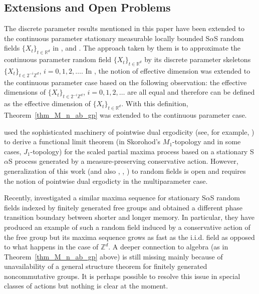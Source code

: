 \documentclass[12pt]{amsart}
\begin{document}
\subsection{Extensions and Open Problems} The discrete parameter results mentioned in this paper have been extended to the continuous parameter stationary measurable locally bounded S$\alpha$S random fields $\{X_t\}_{t \in \mathbb{R}^d}$ in \cite{rosinski:1995, rosinski:2000}, \cite{samorodnitsky:2004b} and \cite{roy:2010b}. The approach taken by them is to approximate the continuous parameter random field $\{X_t\}_{t \in \mathbb{R}^d}$ by its discrete parameter skeletons $\{X_t\}_{t \in  2^{-i}\mathbb{Z}^d}$, $i=0,1,2, \ldots$. In \cite{chakrabarty:roy:2013}, the notion of effective dimension was extended to the continuous parameter case based on the following observation: the effective dimensions of $\{X_t\}_{t \in  2^{-i}\mathbb{Z}^d}$, $i=0,1,2, \ldots$ are all equal and therefore can be defined as the effective dimension of $\{X_t\}_{t \in \mathbb{R}^d}$. With this definition, Theorem~\ref{thm_M_n_ab_gp} was extended to the continuous parameter case.

\cite{owada:samorodnitsky:2015a} used the sophisticated machinery of pointwise dual ergodicity (see, for example, \cite{aaronson:1997}) to derive a functional limit theorem (in Skorohod's $M_1$-topology and in some cases, $J_1$-topology) for the scaled partial maxima process based on a stationary S$\alpha$S process generated by a measure-preserving conservative action. However, generalization of this work (and also \cite{owada:samorodnitsky:2015b}, \cite{jung:owada:samorodnitsky:2015}, \cite{owada:2016}) to random fields is open and requires the notion of pointwise dual ergodicty in the multiparameter case.

Recently, \cite{sarkar:roy:2016} investigated a similar maxima sequence for stationary S$\alpha$S random fields indexed by finitely generated free groups and obtained a different phase transition boundary between shorter and longer memory. In particular, they have produced an example of such a random field induced by a conservative action of the free group but its maxima sequence grows as fast as the i.i.d. field as opposed to what happens in the case of ${\mathbb{Z}^d}$. A deeper connection to algebra (as in Theorem~\ref{thm_M_n_ab_gp} above) is still missing mainly because of unavailability of a general structure theorem for finitely generated noncommutative groups. It is perhaps possible to resolve this issue in special classes of actions but nothing is clear at the moment.
\end{document}
